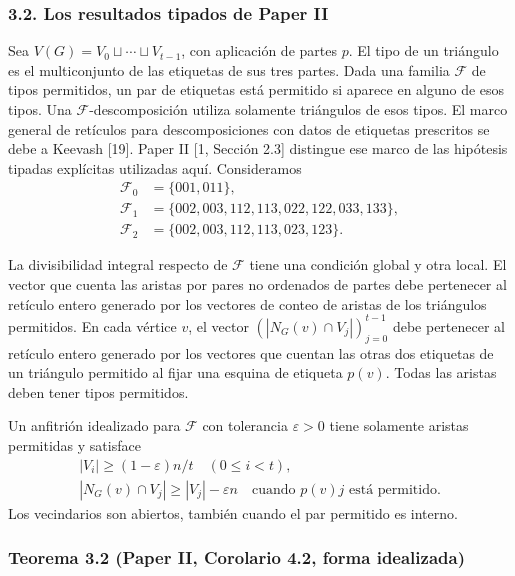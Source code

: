 \documentclass[spanish,11pt,a4paper]{article}
\begin{document}
\subsubsection{3.2. Los resultados tipados de Paper II}\label{los-resultados-tipados-de-paper-ii}

Sea \(V(G)=V_0\sqcup\cdots\sqcup V_{t-1}\), con aplicación de partes \(p\). El tipo de un triángulo es el multiconjunto de las etiquetas de sus tres partes. Dada una familia \(\mathcal F\) de tipos permitidos, un par de etiquetas está permitido si aparece en alguno de esos tipos. Una \(\mathcal F\)-descomposición utiliza solamente triángulos de esos tipos. El marco general de retículos para descomposiciones con datos de etiquetas prescritos se debe a Keevash {[}19{]}. Paper II {[}1, Sección 2.3{]} distingue ese marco de las hipótesis tipadas explícitas utilizadas aquí. Consideramos \[\begin{aligned}
\mathcal F_0&=\{001,011\},\\
\mathcal F_1&=\{002,003,112,113,022,122,033,133\},\\
\mathcal F_2&=\{002,003,112,113,023,123\}.
\end{aligned}
\tag{3.2}\]

La divisibilidad integral respecto de \(\mathcal F\) tiene una condición global y otra local. El vector que cuenta las aristas por pares no ordenados de partes debe pertenecer al retículo entero generado por los vectores de conteo de aristas de los triángulos permitidos. En cada vértice \(v\), el vector \((|N_G(v)\cap V_j|)_{j=0}^{t-1}\) debe pertenecer al retículo entero generado por los vectores que cuentan las otras dos etiquetas de un triángulo permitido al fijar una esquina de etiqueta \(p(v)\). Todas las aristas deben tener tipos permitidos.

Un anfitrión idealizado para \(\mathcal F\) con tolerancia \(\varepsilon>0\) tiene solamente aristas permitidas y satisface \[\begin{gathered}
|V_i|\ge(1-\varepsilon)n/t\quad(0\le i<t),\\
|N_G(v)\cap V_j|\ge|V_j|-\varepsilon n
\quad\text{cuando }p(v)j\text{ está permitido}.
\end{gathered}
\tag{3.3}\] Los vecindarios son abiertos, también cuando el par permitido es interno.

\subsubsection{Teorema 3.2 (Paper II, Corolario 4.2, forma idealizada)}\label{teorema-3.2-paper-ii-corolario-4.2-forma-idealizada}
\end{document}
